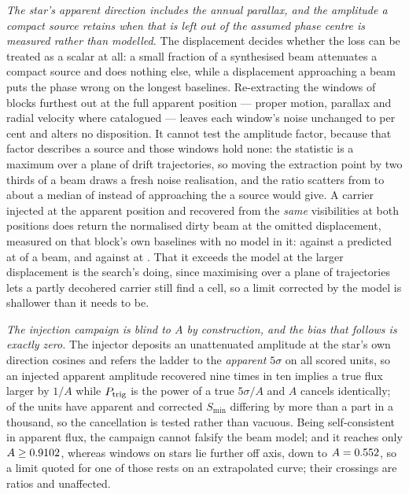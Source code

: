 \emph{The star's apparent direction includes the annual parallax, and the
amplitude a compact source retains when that is left out of the assumed phase
centre is measured rather than modelled.} The displacement decides whether the
loss can be treated as a scalar at all: a small fraction of a synthesised beam
attenuates a compact source and does nothing else, while a displacement
approaching a beam puts the phase wrong on the longest baselines. Re-extracting
the \SensNReextWin{} windows of \SensNReextBlock{} blocks furthest out at the
full apparent position --- proper motion, parallax and radial velocity where
catalogued --- leaves each window's noise unchanged to
\SensReextNoiseMaxPct{} per cent and alters no disposition. It cannot test
the amplitude factor, because that factor describes a source and those
windows hold none: the statistic is a maximum over a plane of drift
trajectories, so moving the extraction point by two thirds of a beam draws a
fresh noise realisation, and the ratio scatters from
\SensReTstarLo{} to \SensReTstarHi{} about a median of \SensReTstarMed{}
instead of approaching the \SensPxLargePred{} a source would give. A
carrier injected at the apparent position and recovered from the \emph{same}
visibilities at both positions does return the normalised dirty beam at the
omitted displacement, measured on that block's own baselines with no model in
it: \SensPxSmallMeas{} against a predicted \SensPxSmallPred{} at
\SensPxSmallBeams{} of a beam, and \SensPxLargeMeas{} against
\SensPxLargePred{} at \SensPxLargeBeams. That it exceeds the model at the
larger displacement is the search's doing, since maximising over a plane of
trajectories lets a partly decohered carrier still find a cell, so a limit
corrected by the model is shallower than it needs to be.

\emph{The injection campaign is blind to $A$ by construction, and the bias
that follows is exactly zero.} The injector deposits an unattenuated amplitude
at the star's own direction cosines and refers the ladder to the
\emph{apparent} $5\sigma$ on all \PbInjNUnit{} scored units, so an injected
apparent amplitude recovered nine times in ten implies a true flux larger by
$1/A$ while $P_{\rm trig}$ is the power of a true $5\sigma/A$ and $A$ cancels
identically; \PbInjNDistinct{} of the units have apparent and corrected
$S_{\min}$ differing by more than a part in a thousand, so the cancellation
is tested rather than vacuous. Being self-consistent in apparent flux, the
campaign cannot falsify the beam model; and it reaches only
$A\ge0.9102$, whereas \PbNBeyond{} windows on \PbNBeyondStar{} stars lie
further off axis, down to $A=0.552$, so a limit quoted for one of
those rests on an extrapolated curve; their \PbNBeyondCross{} crossings are
ratios and unaffected.

